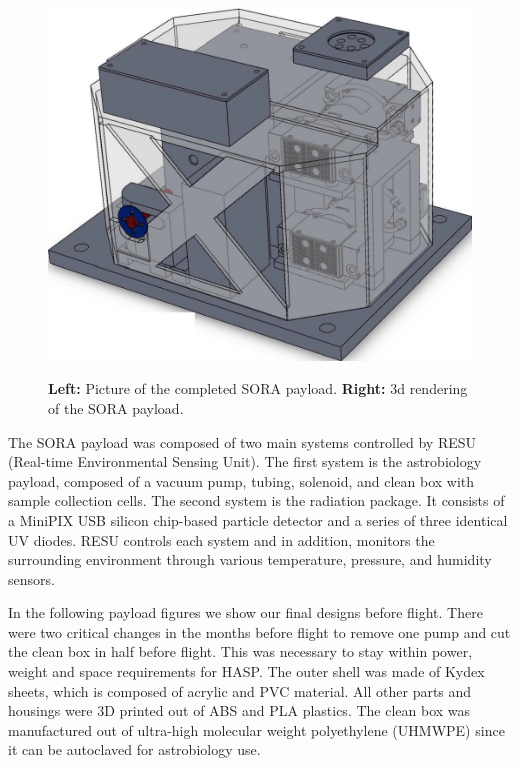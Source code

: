 \begin{figure}[t]
\begin{center}
\begin{minipage}[c]{0.49\linewidth}
      \includegraphics[width=\textwidth]{./Figures/payload_1.jpg}
      \label{fig:Payload_1}
    \end{minipage}
  \end{center}
        \caption{{\bf Left:} Picture of the completed SORA payload.  {\bf Right:} 3d rendering of the SORA payload.}
\end{figure}


The SORA payload was composed of two main systems controlled by RESU (Real-time Environmental Sensing Unit).  The first system is the astrobiology payload, composed of a vacuum pump, tubing, solenoid, and clean box with sample collection cells.  The second system is the radiation package.  It consists of a MiniPIX USB silicon chip-based particle detector and a series of three identical UV diodes.  RESU controls each system and in addition, monitors the surrounding environment through various temperature, pressure, and humidity sensors.  

In the following payload figures we show our final designs before flight.  There were two critical changes in the months before flight to remove one pump and cut the clean box in half before flight. This was necessary to stay within power, weight and space requirements for HASP.  The outer shell was made of Kydex sheets, which is composed of  acrylic and PVC material.  All other parts and housings were 3D printed out of ABS and PLA plastics.  The clean box was manufactured out of ultra-high molecular weight polyethylene (UHMWPE) since it can be autoclaved for astrobiology use.  

